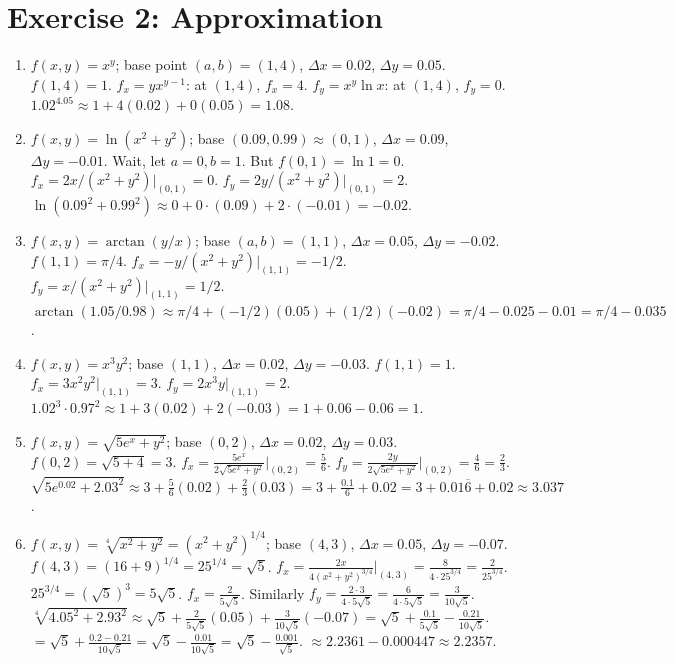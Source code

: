 \documentclass[12pt,a4paper]{article}
\begin{document}
\section*{Exercise 2: Approximation}

\begin{enumerate}[leftmargin=*, label=(\alph*)]

\item $f(x,y)=x^y$; base point $(a,b)=(1,4)$, $\Delta x=0.02$, $\Delta y=0.05$.
$f(1,4)=1$. $f_x=yx^{y-1}$: at $(1,4)$, $f_x=4$. $f_y=x^y\ln x$: at $(1,4)$, $f_y=0$.
$1.02^{4.05}\approx 1+4(0.02)+0(0.05)=1.08$.

\item $f(x,y)=\ln(x^2+y^2)$; base $(0.09,0.99)\approx(0,1)$, $\Delta x=0.09$, $\Delta y=-0.01$.
Wait, let $a=0,b=1$. But $f(0,1)=\ln 1=0$. $f_x=2x/(x^2+y^2)|_{(0,1)}=0$. $f_y=2y/(x^2+y^2)|_{(0,1)}=2$.
$\ln(0.09^2+0.99^2)\approx 0+0\cdot(0.09)+2\cdot(-0.01)=-0.02$.

\item $f(x,y)=\arctan(y/x)$; base $(a,b)=(1,1)$, $\Delta x=0.05$, $\Delta y=-0.02$.
$f(1,1)=\pi/4$. $f_x=-y/(x^2+y^2)|_{(1,1)}=-1/2$. $f_y=x/(x^2+y^2)|_{(1,1)}=1/2$.
$\arctan(1.05/0.98)\approx\pi/4+(-1/2)(0.05)+(1/2)(-0.02)=\pi/4-0.025-0.01=\pi/4-0.035$.

\item $f(x,y)=x^3 y^2$; base $(1,1)$, $\Delta x=0.02$, $\Delta y=-0.03$.
$f(1,1)=1$. $f_x=3x^2y^2|_{(1,1)}=3$. $f_y=2x^3y|_{(1,1)}=2$.
$1.02^3\cdot 0.97^2\approx 1+3(0.02)+2(-0.03)=1+0.06-0.06=1$.

\item $f(x,y)=\sqrt{5e^x+y^2}$; base $(0,2)$, $\Delta x=0.02$, $\Delta y=0.03$.
$f(0,2)=\sqrt{5+4}=3$. $f_x=\frac{5e^x}{2\sqrt{5e^x+y^2}}|_{(0,2)}=\frac{5}{6}$.
$f_y=\frac{2y}{2\sqrt{5e^x+y^2}}|_{(0,2)}=\frac{4}{6}=\frac{2}{3}$.
$\sqrt{5e^{0.02}+2.03^2}\approx 3+\frac{5}{6}(0.02)+\frac{2}{3}(0.03)=3+\frac{0.1}{6}+0.02=3+0.01\overline{6}+0.02\approx 3.037$.

\item $f(x,y)=\sqrt[4]{x^2+y^2}=(x^2+y^2)^{1/4}$; base $(4,3)$, $\Delta x=0.05$, $\Delta y=-0.07$.
$f(4,3)=(16+9)^{1/4}=25^{1/4}=\sqrt{5}$.
$f_x=\frac{2x}{4(x^2+y^2)^{3/4}}|_{(4,3)}=\frac{8}{4\cdot 25^{3/4}}=\frac{2}{25^{3/4}}$.
$25^{3/4}=(\sqrt{5})^3=5\sqrt{5}$. $f_x=\frac{2}{5\sqrt{5}}$.
Similarly $f_y=\frac{2\cdot 3}{4\cdot 5\sqrt{5}}=\frac{6}{4\cdot 5\sqrt{5}}=\frac{3}{10\sqrt{5}}$.
$\sqrt[4]{4.05^2+2.93^2}\approx\sqrt{5}+\frac{2}{5\sqrt{5}}(0.05)+\frac{3}{10\sqrt{5}}(-0.07)=\sqrt{5}+\frac{0.1}{5\sqrt{5}}-\frac{0.21}{10\sqrt{5}}$.
$=\sqrt{5}+\frac{0.2-0.21}{10\sqrt{5}}=\sqrt{5}-\frac{0.01}{10\sqrt{5}}=\sqrt{5}-\frac{0.001}{\sqrt{5}}$.
$\approx 2.2361-0.000447\approx 2.2357$.

\end{enumerate}
\end{document}
